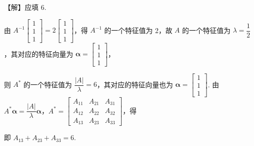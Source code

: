 【解】应填 6.

由 $A^{-1}\begin{bmatrix}1\\1\\1\end{bmatrix}=2\begin{bmatrix}1\\1\\1\end{bmatrix}$，得 $A^{-1}$ 的一个特征值为 2，故 $A$ 的一个特征值为 $\lambda=\dfrac{1}{2}$，其对应的特征向量为 $\boldsymbol{\alpha}=\begin{bmatrix}1\\1\\1\end{bmatrix}$，

则 $A^{*}$ 的一个特征值为 $\dfrac{|A|}{\lambda}=6$，其对应的特征向量也为 $\boldsymbol{\alpha}=\begin{bmatrix}1\\1\\1\end{bmatrix}$. 由 $A^{*}\boldsymbol{\alpha}=\dfrac{|A|}{\lambda}\boldsymbol{\alpha}$，$A^{*}=\begin{bmatrix}A_{11}&A_{21}&A_{31}\\A_{12}&A_{22}&A_{32}\\A_{13}&A_{23}&A_{33}\end{bmatrix}$，得

即 $A_{13}+A_{23}+A_{33}=6$.

